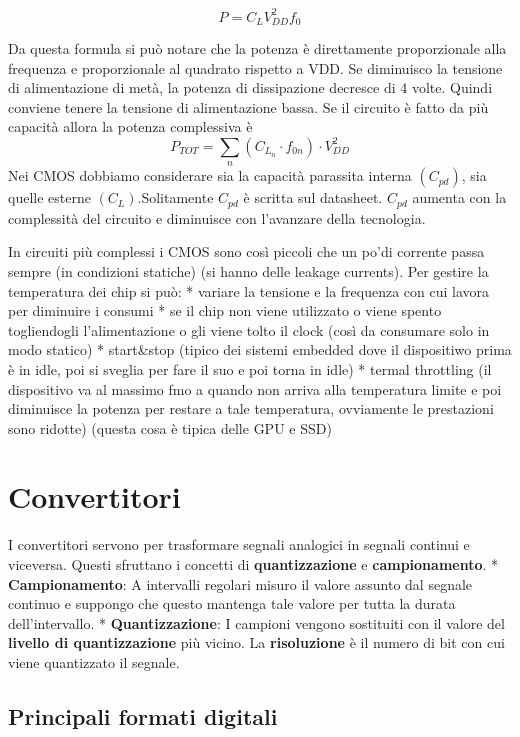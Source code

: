 \documentclass[
]{book}
\begin{document}
\[P=C_{L}V_{DD}^{2}f_{0}\]

Da questa formula si può notare che la potenza è direttamente
proporzionale alla frequenza e proporzionale al quadrato rispetto a VDD.
Se diminuisco la tensione di alimentazione di metà, la potenza di
dissipazione decresce di 4 volte. Quindi conviene tenere la tensione di
alimentazione bassa. Se il circuito è fatto da più capacità allora la
potenza complessiva è \[
P_{TOT}=\sum_{n}(C_{L_{n}}\cdot f_{0n})\cdot V_{DD}^{2}
\] Nei CMOS dobbiamo considerare sia la capacità parassita interna
\((C_{pd})\), sia quelle esterne \((C_{L})\).Solitamente \(C_{pd}\) è
scritta sul datasheet. \(C_{pd}\) aumenta con la complessità del
circuito e diminuisce con l'avanzare della tecnologia.

In circuiti più complessi i CMOS sono così piccoli che un po'di corrente
passa sempre (in condizioni statiche) (si hanno delle leakage currents).
Per gestire la temperatura dei chip si può: * variare la tensione e la
frequenza con cui lavora per diminuire i consumi * se il chip non viene
utilizzato o viene spento togliendogli l'alimentazione o gli viene tolto
il clock (così da consumare solo in modo statico) * start\&stop (tipico
dei sistemi embedded dove il dispositiwo prima è in idle, poi si sveglia
per fare il suo e poi torna in idle) * termal throttling (il dispositivo
va al massimo fmo a quando non arriva alla temperatura limite e poi
diminuisce la potenza per restare a tale temperatura, ovviamente le
prestazioni sono ridotte) (questa cosa è tipica delle GPU e SSD)

\section{Convertitori}\label{convertitori}

I convertitori servono per trasformare segnali analogici in segnali
continui e viceversa. Questi sfruttano i concetti di
\textbf{quantizzazione} e \textbf{campionamento}. *
\textbf{Campionamento}: A intervalli regolari misuro il valore assunto
dal segnale continuo e suppongo che questo mantenga tale valore per
tutta la durata dell'intervallo. * \textbf{Quantizzazione}: I campioni
vengono sostituiti con il valore del \textbf{livello di quantizzazione}
più vicino. La \textbf{risoluzione} è il numero di bit con cui viene
quantizzato il segnale.

\subsection{Principali formati
digitali}\label{principali-formati-digitali}
\end{document}
